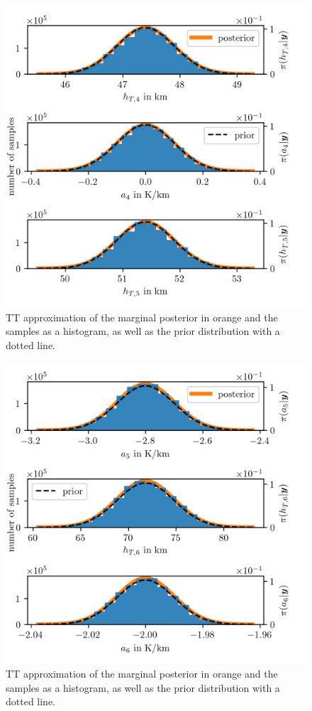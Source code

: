 \begin{figure}[ht!]
	\centering
	\includegraphics{PHdPTPost4.png}
	\caption[Histograms and TT approximation of posterior distribution as well as hyper-prior distribution.]{TT approximation of the marginal posterior in orange and the samples as a histogram, as well as the prior distribution with a dotted line.}
	\label{fig:PostHistTT4}
\end{figure}
\begin{figure}[ht!]
	\centering
	\includegraphics{PHdPTPost5.png}
	\caption[Histograms and TT approximation of posterior distribution as well as hyper-prior distribution.]{TT approximation of the marginal posterior in orange and the samples as a histogram, as well as the prior distribution with a dotted line.}
	\label{fig:PostHistTT5}
\end{figure}

